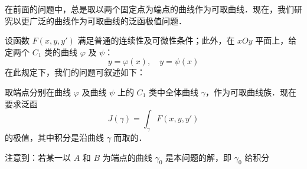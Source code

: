 在前面的问题中，总是取以两个固定点为端点的曲线作为可取曲线．现在，我们研究以更广泛的曲线作为可取曲线的泛函极值问题．

设函数 $F(x,y,y')$ 满足普通的连续性及可微性条件；此外，在 $xOy$ 平面上，给定两个 $C_1$ 类的曲线 $\varphi$ 及 $\psi$：
\begin{equation}
y=\varphi(x),\quad y=\psi(x)
\end{equation}
在此规定下，我们的问题可叙述如下：

取端点分别在曲线 $\varphi$ 及曲线 $\psi$ 上的 $C_1$ 类中全体曲线 $\gamma$，作为可取曲线族．现在要求泛函
\begin{equation}\label{EPQue_eq1}
J(\gamma)=\int_\gamma F(x,y,y')
\end{equation}
的极值，其中积分是沿曲线 $\gamma$ 而取的．

注意到：若某一以 $A$ 和 $B$ 为端点的曲线 $\gamma_0$ 是本问题的解，即 $\gamma_0$ 给积分